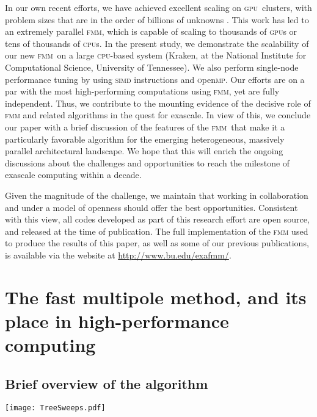 \documentclass[10pt,twocolumn]{article}
\newcommand{\fmm}{\textsc{fmm}\xspace}
\newcommand{\cpu}{\textsc{cpu}}
\newcommand{\gpu}{\textsc{gpu}}
\newcommand{\simd}{\textsc{simd}\xspace}
\newcommand{\openmp}{\textsc{o}pen\textsc{mp}\xspace}
\newlength{\up}
\begin{document}
In our own recent efforts, we have achieved excellent scaling on \gpu\ clusters, with problem sizes that are in the order of billions of unknowns \cite[]{YokotaETal2011a,YokotaETal2011b}. This work has led to an extremely parallel \fmm, which is capable of scaling to thousands of \gpu s or tens of thousands of \cpu s. In the present study, we demonstrate the scalability of our new \fmm\ on a large \cpu-based system (Kraken, at the National Institute for Computational Science, University of Tennessee). We also perform single-node performance tuning by using \simd instructions and \openmp.   Our efforts are on a par with the most high-performing computations using \fmm, yet are fully independent. Thus, we contribute to the mounting evidence of the decisive role of \fmm and related algorithms in the quest for exascale. In view of this, we conclude our paper with a brief  discussion of the features of the \fmm\ that make it a  particularly favorable algorithm for the emerging heterogeneous, massively parallel architectural landscape. We hope that this will enrich the ongoing discussions about the challenges and opportunities to reach the milestone of exascale computing within a decade. 

\medskip

Given the magnitude of the challenge, we maintain that working in collaboration and under a model of openness should offer the best opportunities. Consistent with this view, all codes developed as part of this research effort are open source, and released at the time of publication. The full implementation of the \fmm used to produce the results of this paper, as well as some of our previous publications, is available via the website at \href{http://www-test.bu.edu/exafmm/}{http://www.bu.edu/exafmm/}.



\section{The fast multipole method, and its place in high-performance computing}

\subsection{Brief overview of the algorithm}


\begin{figure*}
	\centering
	{\texttt{[image: TreeSweeps.pdf]}}
\vspace{-0.1cm}	\caption{\small Illustration of  \fmm algorithm components, with the  \emph{upward sweep} depicted on the left side of the tree, and the \emph{downward sweep} depicted on the right side of the tree.  The multipole expansions are created at the leaf level in the P2M operation, they are translated upwards to the center of the parent cells in the multipole-to-multipole (M2M) translation, then transformed to a local expansion in the M2L operation for the siblings at all levels deeper than level 1. The local expansions are translated downward to children cells in the L2L operation and finally, the local expansions are added at the leaf level and evaluated in the L2P operation.}
	\label{fig:tree5}
\end{figure*}
\end{document}
